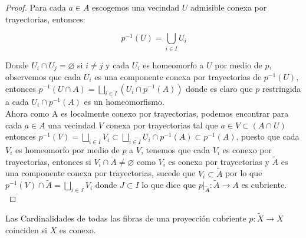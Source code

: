 \begin{proof} 
Para cada $a \in A$ escogemos una vecindad $U$ admisible conexa por trayectorias, entonces:

$$p^{-1}(U)=\bigcup_{i \in I}U_i$$ 

Donde $U_i \cap U_j= \varnothing$ si $i \neq j$ y cada $U_i$ es homeomorfo a $U$ por medio de $p$, observemos que cada $U_i$ es una componente conexa por  trayectorias de $p^{-1}(U)$, entonces $p^{-1}(U \cap A)=\bigsqcup_{i \in I}(U_i \cap p^{-1}(A))$ donde es claro que $p$ restringida a cada $U_i \cap p^{-1}(A)$ es un homeomorfismo.\\ 
Ahora como A es localmente conexo por trayectorias, podemos encontrar para cada $a\in A$ una vecindad $V$ conexa por trayectorias tal que $a\in V \subset (A \cap U)$ entonces $p^{-1}(V)=\bigsqcup_{i \in I}V_i \subset \bigsqcup_{i \in I} U_i \cap p^{-1}(A) \subset p^{-1}(A)$, puesto que cada $V_i$ es homeomorfo por medio de $p$ a $V$, tenemos que cada $V_i$ es conexo por trayectorias, entonces si $V_i \cap \widetilde{A} \neq \varnothing$ como $V_i$ es conexo por trayectorias y $\widetilde{A}$ es una componente conexa por trayectorias, sucede que $V_i \subset \widetilde {A}$ por lo que $p^{-1}(V) \cap \widetilde{A} = \bigsqcup_{i \in J} V_i$ donde $J \subset I$ lo que dice que $p \vert_{\widetilde{A}}:  \widetilde{A} \rightarrow A$ es cubriente.\\
\end{proof}

\begin{theorem}
Las Cardinalidades de todas las fibras de una proyecci\'on cubriente $p: \widetilde{X} \rightarrow X$ coinciden si $X$ es conexo.\\
\end{theorem}

